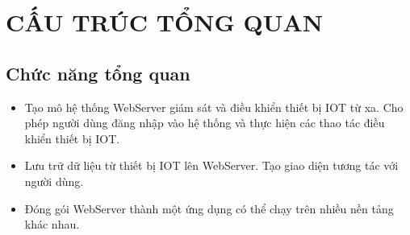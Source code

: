 \chapter{CẤU TRÚC TỔNG QUAN}
    \section{Chức năng tổng quan}
        \begin{itemize}
            \item Tạo mô hệ thống WebServer giám sát và điều khiển thiết bị IOT từ xa. Cho phép người dùng đăng nhập vào hệ thống và thực hiện các thao tác điều khiển thiết bị IOT.
            \item Lưu trữ dữ liệu từ thiết bị IOT lên WebServer. Tạo giao diện tương tác với người dùng.
            \item Đóng gói WebServer thành một ứng dụng có thể chạy trên nhiều nền tảng khác nhau.
        \end{itemize}
